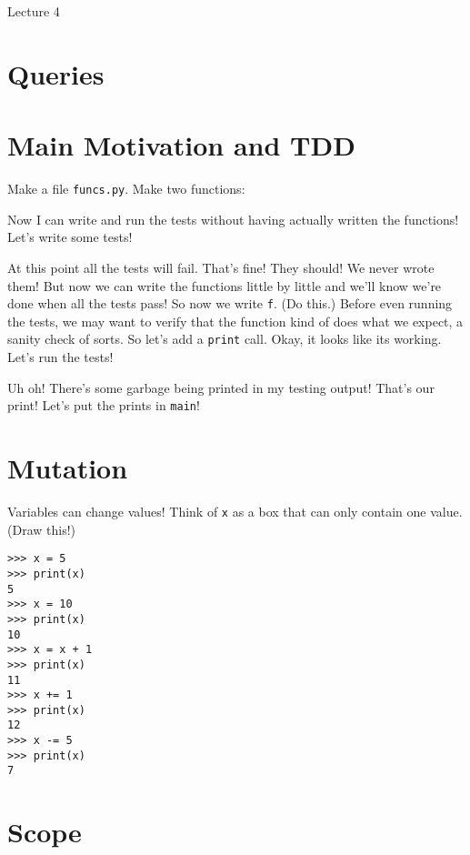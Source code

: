 \documentclass[12pt]{article}
\begin{document}
\begin{center}
   \LARGE Lecture 4
\end{center}

\setcounter{section}{-1}
\section{Queries}

\section{Main Motivation and TDD}

Make a file \lstinline{funcs.py}.  Make two functions:



\noindent
Now I can write and run the tests without having actually written the
functions!  Let's write some tests!



\noindent
At this point all the tests will fail.  That's fine!  They should!  We never
wrote them!  But now we can write the functions little by little and we'll know
we're done when all the tests pass!  So now we write \lstinline{f}.  (Do this.)
Before even running the tests, we may want to verify that the function kind of
does what we expect, a sanity check of sorts.  So let's add a \lstinline{print}
call.  Okay, it looks like its working.  Let's run the tests!
\vspace{2ex}


\noindent
Uh oh!  There's some garbage being printed in my testing output!  That's our
print!  Let's put the prints in \lstinline{main}!

\section*{Mutation}

Variables can change values!  Think of \lstinline{x} as a box that can only
contain one value.  (Draw this!)

\begin{lstlisting}
>>> x = 5
>>> print(x)
5
>>> x = 10
>>> print(x)
10
>>> x = x + 1
>>> print(x)
11
>>> x += 1
>>> print(x)
12
>>> x -= 5
>>> print(x)
7
\end{lstlisting}

\section{Scope}
\end{document}

